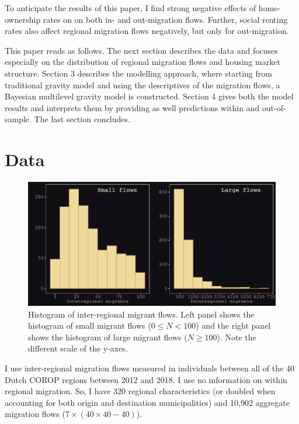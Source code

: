 \documentclass[fleqn,10pt]{SelfArx} %
\begin{document}
To anticipate the results of this paper, I find strong negative effects of
home-ownership rates on on both in- and out-migration flows. Further, social
renting rates also affect regional migration flows negatively, but only for
out-migration.

This paper reads as follows. The next section describes the data and focuses
especially on the distribution of regional migration flows and housing market
structure. Section 3 describes the modelling approach, where starting from
traditional gravity model and using the descriptives of the migration flows, a
Bayesian multilevel gravity model is constructed. Section 4 gives both the model
results and interprets them by providing as well predictions within and
out-of-sample. The last section concludes.

 \section{Data}

 \begin{figure}[t!]\centering %
   \includegraphics[width=0.8\linewidth]{./../../fig/hist_mig_corop.pdf}
          \caption{Histogram of inter-regional migrant flows. Left panel shows the histogram of
small migrant flows ($0 \leq N < 100$) and the right panel shows the histogram of
large migrant flows ($N \geq 100$). Note the different scale of the y-axes.}
          \label{fig:hist_mig_corop}
        \end{figure}

I use inter-regional migration flows measured in individuals between
all of the 40 Dutch COROP regions between 2012 and 2018. I use no information on
within regional migration. So, I have 320 regional
characteristics (or doubled when accounting for both origin and destination
municipalities) and 10,902 aggregate migration flows ($7 \times (40 \times 40 - 40)$).
\end{document}
